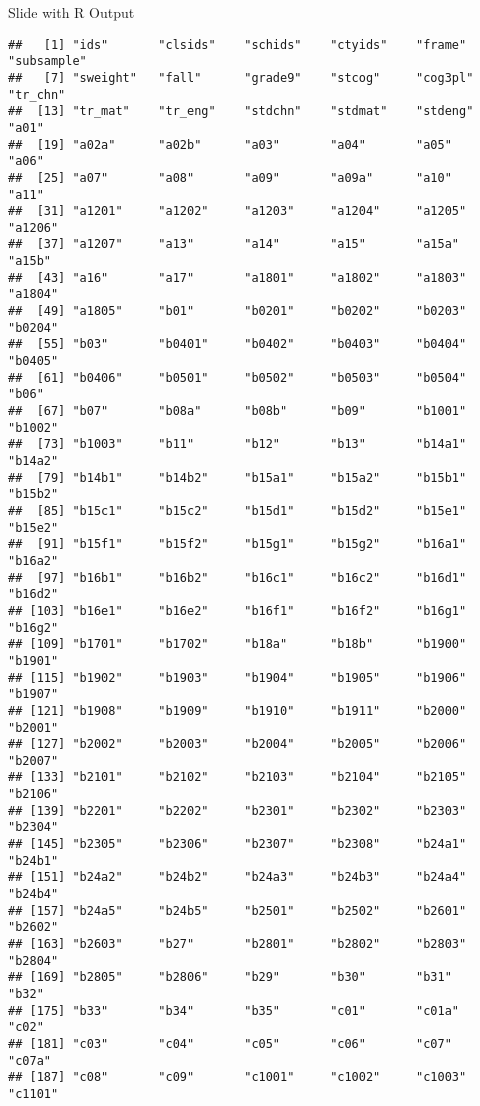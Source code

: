 \documentclass[
  ignorenonframetext,
]{beamer}
\begin{document}
\begin{frame}[fragile]{Slide with R Output}
\begin{verbatim}
##   [1] "ids"       "clsids"    "schids"    "ctyids"    "frame"     "subsample"
##   [7] "sweight"   "fall"      "grade9"    "stcog"     "cog3pl"    "tr_chn"   
##  [13] "tr_mat"    "tr_eng"    "stdchn"    "stdmat"    "stdeng"    "a01"      
##  [19] "a02a"      "a02b"      "a03"       "a04"       "a05"       "a06"      
##  [25] "a07"       "a08"       "a09"       "a09a"      "a10"       "a11"      
##  [31] "a1201"     "a1202"     "a1203"     "a1204"     "a1205"     "a1206"    
##  [37] "a1207"     "a13"       "a14"       "a15"       "a15a"      "a15b"     
##  [43] "a16"       "a17"       "a1801"     "a1802"     "a1803"     "a1804"    
##  [49] "a1805"     "b01"       "b0201"     "b0202"     "b0203"     "b0204"    
##  [55] "b03"       "b0401"     "b0402"     "b0403"     "b0404"     "b0405"    
##  [61] "b0406"     "b0501"     "b0502"     "b0503"     "b0504"     "b06"      
##  [67] "b07"       "b08a"      "b08b"      "b09"       "b1001"     "b1002"    
##  [73] "b1003"     "b11"       "b12"       "b13"       "b14a1"     "b14a2"    
##  [79] "b14b1"     "b14b2"     "b15a1"     "b15a2"     "b15b1"     "b15b2"    
##  [85] "b15c1"     "b15c2"     "b15d1"     "b15d2"     "b15e1"     "b15e2"    
##  [91] "b15f1"     "b15f2"     "b15g1"     "b15g2"     "b16a1"     "b16a2"    
##  [97] "b16b1"     "b16b2"     "b16c1"     "b16c2"     "b16d1"     "b16d2"    
## [103] "b16e1"     "b16e2"     "b16f1"     "b16f2"     "b16g1"     "b16g2"    
## [109] "b1701"     "b1702"     "b18a"      "b18b"      "b1900"     "b1901"    
## [115] "b1902"     "b1903"     "b1904"     "b1905"     "b1906"     "b1907"    
## [121] "b1908"     "b1909"     "b1910"     "b1911"     "b2000"     "b2001"    
## [127] "b2002"     "b2003"     "b2004"     "b2005"     "b2006"     "b2007"    
## [133] "b2101"     "b2102"     "b2103"     "b2104"     "b2105"     "b2106"    
## [139] "b2201"     "b2202"     "b2301"     "b2302"     "b2303"     "b2304"    
## [145] "b2305"     "b2306"     "b2307"     "b2308"     "b24a1"     "b24b1"    
## [151] "b24a2"     "b24b2"     "b24a3"     "b24b3"     "b24a4"     "b24b4"    
## [157] "b24a5"     "b24b5"     "b2501"     "b2502"     "b2601"     "b2602"    
## [163] "b2603"     "b27"       "b2801"     "b2802"     "b2803"     "b2804"    
## [169] "b2805"     "b2806"     "b29"       "b30"       "b31"       "b32"      
## [175] "b33"       "b34"       "b35"       "c01"       "c01a"      "c02"      
## [181] "c03"       "c04"       "c05"       "c06"       "c07"       "c07a"     
## [187] "c08"       "c09"       "c1001"     "c1002"     "c1003"     "c1101"    

\end{verbatim}
\end{frame}
\end{document}
